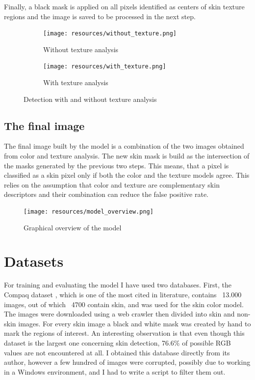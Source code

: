 \documentclass[12pt]{report}
\begin{document}
	Finally, a black mask is applied on all pixels identified as centers of skin texture regions and the image is saved to be processed in the next step.
	
	\begin{figure}[h!]
		\centering
		\begin{subfigure}[b]{0.3\linewidth}
			\texttt{[image: resources/without\_texture.png]}
			\caption{Without texture analysis}
		\end{subfigure}
		\begin{subfigure}[b]{0.3\linewidth}
			\texttt{[image: resources/with\_texture.png]}
			\caption{With texture analysis}
		\end{subfigure}
		\caption{Detection with and without texture analysis}
		\label{fig:texture_use}
	\end{figure}
	
	\subsection{The final image}
	The final image built by the model is a combination of the two images obtained from color and texture analysis. The new skin mask is build as the intersection of the masks generated by the previous two steps. This means, that a pixel is classified as a skin pixel only if both the color and the texture models agree. This relies on the assumption that color and texture are complementary skin descriptors and their combination can reduce the false positive rate.
	
	\begin{figure}[h!]
		\texttt{[image: resources/model\_overview.png]}
		\caption{Graphical overview of the model}
		\label{fig:model_overview}
	\end{figure}
	
	\section{Datasets}
	For training and evaluating the model I have used two databases. First, the Compaq dataset \cite{compaq}, which is one of the most cited in literature, contains ~13.000 images, out of which ~4700 contain skin, and was used for the skin color model. The images were downloaded using a web crawler then divided into skin and non-skin images. For every skin image a black and white mask was created by hand to mark the regions of interest. An interesting observation is that even though this dataset is the largest one concerning skin detection, 76.6\% of possible RGB values are not encountered at all. I obtained this database directly from its author, however a few hundred of images were corrupted, possibly due to working in a Windows environment, and I had to write a script to filter them out.
	
\end{document}
